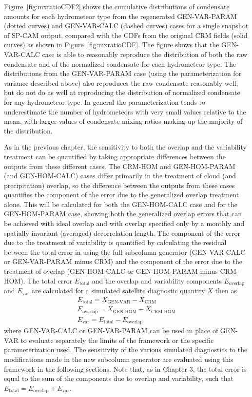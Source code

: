 Figure~\ref{fig:mxratioCDF2} shows the cumulative distributions of
condensate amounts for each hydrometeor type from the regenerated
GEN-VAR-PARAM (dotted curves) and GEN-VAR-CALC (dashed curves) cases for
a single snapshot of SP-CAM output, compared with the CDFs from the
original CRM fields (solid curves) as shown in
Figure~\ref{fig:mxratioCDF}. The figure shows that the GEN-VAR-CALC case
is able to reasonably reproduce the distribution of both the raw
condensate and of the normalized condensate for each hydrometeor type.
The distributions from the GEN-VAR-PARAM case (using the
parameterization for variance described above) also reproduces the raw
condensate reasonably well, but do not do as well at reproducing the
distribution of normalized condensate for any hydrometeor type. In
general the parameterization tends to underestimate the number of
hydrometeors with very small values relative to the mean, with larger
values of condensate mixing ratios making up the majority of the
distribution.

As in the previous chapter, the sensitivity to both the overlap and the
variability treatment can be quantified by taking appropriate
differences between the outputs from these different cases. The CRM-HOM
and GEN-HOM-PARAM (and GEN-HOM-CALC) cases differ primarily in the
treatment of cloud (and precipitation) overlap, so the difference
between the outputs from these cases quantifies the component of the
error due to the generalized overlap treatment alone. This will be
calculated for both the GEN-HOM-CALC case and for the GEN-HOM-PARAM
case, showing both the generalized overlap errors that can be achieved
with ideal overlap and with overlap specified only by a monthly and
spatially invariant (averaged) decorrelation length. The component of
the error due to the treatment of variability is quantified by
calculating the residual between the total error in using the full
subcolumn generator (GEN-VAR-CALC or GEN-VAR-PARAM minus CRM) and the
component of the error due to the treatment of overlap (GEN-HOM-CALC or
GEN-HOM-PARAM minus CRM-HOM). The total error \(E_\textrm{total}\) and
the overlap and variability components \(E_\textrm{overlap}\) and
\(E_\textrm{var}\) are calculated for a simulated satellite diagnostic
quantity \(X\) then as \[\begin{gathered} 
    E_\textrm{total} = X_\textrm{GEN-VAR} - X_\textrm{CRM} \\ 
    E_\textrm{overlap} = X_\textrm{GEN-HOM} - X_\textrm{CRM-HOM} \\ 
    E_\textrm{var} = E_\textrm{total} - E_\textrm{overlap}
\end{gathered}\] where GEN-VAR-CALC or GEN-VAR-PARAM can be used in
place of GEN-VAR to evaluate separately the limits of the framework or
the specific parameterization used. The sensitivity of the various
simulated diagnostics to the modifications made in the new subcolumn
generator are evaluated using this framework in the following sections.
Note that, as in Chapter 3, the total error is equal to the sum of the
components due to overlap and variability, such that
\(E_\textrm{total} = E_\textrm{overlap} + E_\textrm{var}\).


